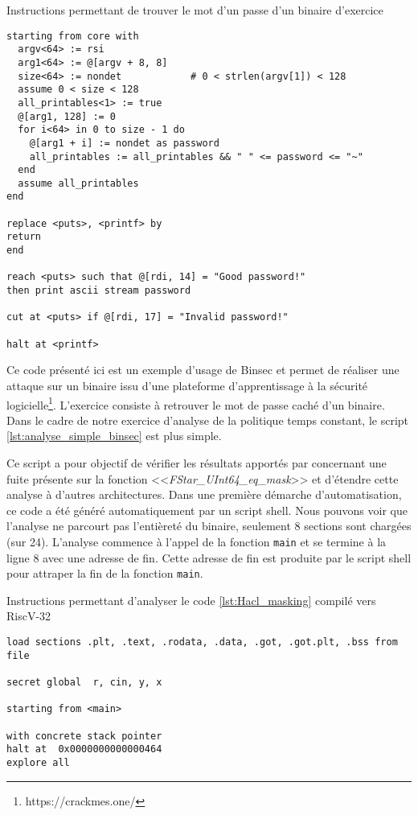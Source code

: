 \begin{listing}[!ht]
    \caption{Instructions permettant de trouver le mot d'un passe d'un binaire d'exercice}
    \label{lst:exemple_binsec}
    \begin{verbatim}
starting from core with
  argv<64> := rsi
  arg1<64> := @[argv + 8, 8]
  size<64> := nondet            # 0 < strlen(argv[1]) < 128
  assume 0 < size < 128
  all_printables<1> := true
  @[arg1, 128] := 0
  for i<64> in 0 to size - 1 do
    @[arg1 + i] := nondet as password
    all_printables := all_printables && " " <= password <= "~"
  end
  assume all_printables
end

replace <puts>, <printf> by
return
end

reach <puts> such that @[rdi, 14] = "Good password!"
then print ascii stream password

cut at <puts> if @[rdi, 17] = "Invalid password!"

halt at <printf>
\end{verbatim}
\end{listing}

Ce code présenté ici est un exemple d'usage de Binsec et permet de réaliser une attaque sur un binaire issu d'une plateforme d'apprentissage à la sécurité logicielle\footnote{https://crackmes.one/}. L'exercice consiste à retrouver le mot de passe caché d'un binaire. Dans le cadre de notre exercice d'analyse de la politique temps constant, le script \ref{lst:analyse_simple_binsec} est plus simple.\medbreak

Ce script a pour objectif de vérifier les résultats apportés par \cite{schneider2024breakingbadcompilersbreak} concernant une fuite présente sur la fonction <<\textit{FStar\_UInt64\_eq\_mask}>> et d'étendre cette analyse à d'autres architectures. Dans une première démarche d'automatisation, ce code a été généré automatiquement par un script shell. Nous pouvons voir que l'analyse ne parcourt pas l'entièreté du binaire, seulement 8 sections sont chargées (sur 24). L'analyse commence à l'appel de la fonction \texttt{main} et se termine à la ligne 8 avec une adresse de fin. Cette adresse de fin est produite par le script shell pour attraper la fin de la fonction \texttt{main}. 

\begin{listing}[!ht]
    \caption{Instructions permettant d'analyser le code \ref{lst:Hacl_masking} compilé vers RiscV-32}
    \label{lst:analyse_simple_binsec}
    \begin{verbatim}
load sections .plt, .text, .rodata, .data, .got, .got.plt, .bss from file

secret global  r, cin, y, x

starting from <main>

with concrete stack pointer
halt at  0x0000000000000464
explore all

\end{verbatim}
\end{listing}


